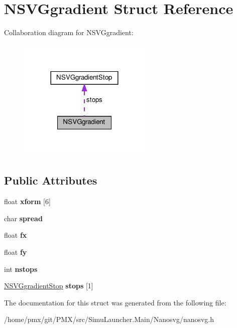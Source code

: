 \hypertarget{structNSVGgradient}{}\section{N\+S\+V\+Ggradient Struct Reference}
\label{structNSVGgradient}


Collaboration diagram for N\+S\+V\+Ggradient\+:
\nopagebreak
\begin{figure}[H]
\begin{center}
\leavevmode
\includegraphics[width=180pt]{structNSVGgradient__coll__graph}
\end{center}
\end{figure}
\subsection*{Public Attributes}
\begin{DoxyCompactItemize}
\item 
\mbox{\label{structNSVGgradient_aa3f41bbeafbf866b27a7bc00692627fd}} 
float {\bfseries xform} \mbox{[}6\mbox{]}
\item 
\mbox{\label{structNSVGgradient_ad0ca9ce76308864dbb28c25a9746ec78}} 
char {\bfseries spread}
\item 
\mbox{\label{structNSVGgradient_acab1f454612d5c1b7842829fe53b3765}} 
float {\bfseries fx}
\item 
\mbox{\label{structNSVGgradient_a2a2ba27a56ad6eb78c494cdae665247a}} 
float {\bfseries fy}
\item 
\mbox{\label{structNSVGgradient_ac9e36f37d0cb087a0e599d966956f212}} 
int {\bfseries nstops}
\item 
\mbox{\label{structNSVGgradient_afbfa3c24c71e8b02ee1e56bd9c2101a8}} 
\hyperlink{structNSVGgradientStop}{N\+S\+V\+Ggradient\+Stop} {\bfseries stops} \mbox{[}1\mbox{]}
\end{DoxyCompactItemize}


The documentation for this struct was generated from the following file\+:\begin{DoxyCompactItemize}
\item 
/home/pmx/git/\+P\+M\+X/src/\+Simu\+Launcher.\+Main/\+Nanosvg/nanosvg.\+h\end{DoxyCompactItemize}
